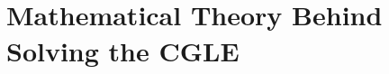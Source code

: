 \documentclass[a4paper,12pt]{report}
\begin{document}
\\
\\









\chapter{Mathematical Theory Behind Solving the CGLE}
\end{document}
